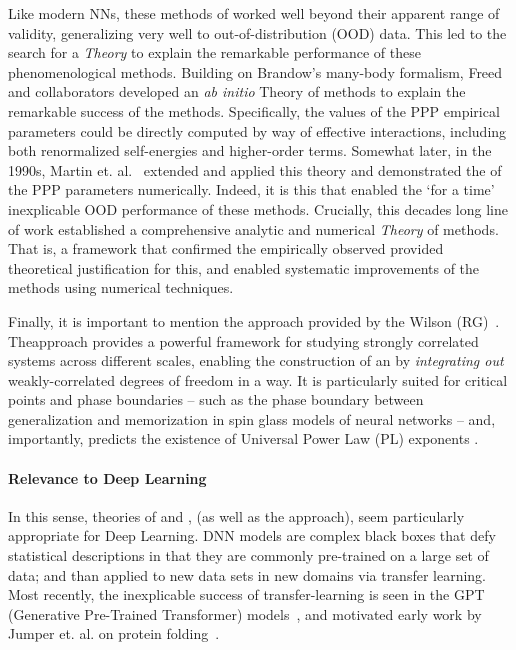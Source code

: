 Like modern NNs, these \SemiEmpirical methods of \QuantumChemistry
worked well beyond their apparent range of validity,
generalizing very well to out-of-distribution (OOD) data. This led to the
search for a \SemiEmpirical \emph{Theory} to explain the
remarkable performance of these phenomenological methods.
Building on Brandow’s many-body formalism, Freed and collaborators
\cite{freed1977, Freed1983}
developed an \emph{ab initio} \EffectiveHamiltonian
Theory of \SemiEmpirical methods to explain the remarkable success of the \SemiEmpirical methods.
Specifically, the values of the PPP empirical parameters could be directly computed by way of
effective interactions, including both renormalized self-energies and higher-order terms.
 Somewhat later, in the 1990s,
 Martin et. al.~\cite{MartinFreed1996, Martin1996, Martin1996_CPL, Martin1998}
 extended and applied this \EffectiveHamiltonian theory
 and demonstrated the \Universality of the \SemiEmpirical PPP parameters numerically.
 Indeed, it is this \Universality that enabled the `for a time' inexplicable
 OOD performance of these methods.
 Crucially, this decades long line of work established a comprehensive
 analytic and numerical \emph{Theory} of \SemiEmpirical methods.
 That is, a framework that confirmed the empirically observed \Universality
 provided theoretical justification for this,
 and enabled systematic improvements of the methods using numerical techniques.

 Finally, it is important to mention the \EffectiveHamiltonian approach provided by the Wilson \emph{\RenormalizationGroup}
 (RG)~\cite{NobelPrizeRG,PhysRevLett.69.800}.
 The\ERG approach provides a powerful framework for studying strongly correlated systems across different scales,
 enabling the construction of an \EffectiveHamiltonian by \emph{integrating out} weakly-correlated degrees of freedom in a \ScaleInvariant way.
 It is particularly suited for critical points and phase boundaries --
 such as the phase boundary between generalization and memorization in spin glass models of neural networks --
 and, importantly, predicts the existence of Universal Power Law (PL) exponents .
 
 \paragraph{Relevance to Deep Learning}
 In this sense, \SemiEmpirical theories of \NuclearPhysics and \QuantumChemistry,
 (as well as the \RenormalizationGroup approach), seem particularly appropriate
 for Deep Learning.
  DNN models are complex black boxes that defy statistical descriptions in that
  they are commonly pre-trained on a large set of data; and than applied to new data sets in new domains via transfer learning.
  Most recently, the inexplicable success of transfer-learning is seen
in the GPT (Generative Pre-Trained Transformer) models~\cite{Radford2018},
and motivated early work by Jumper et. al. on protein folding~\cite{JKS16_TR}.

